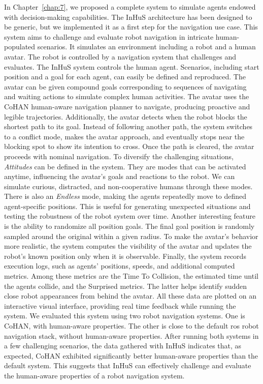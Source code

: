 In Chapter~\ref{chap:7}, we proposed a complete system to simulate agents endowed with decision-making capabilities. The InHuS architecture has been designed to be generic, but we implemented it as a first step for the navigation use case. 
This system aims to challenge and evaluate robot navigation in intricate human-populated scenarios. It simulates an environment including a robot and a human avatar. The robot is controlled by a navigation system that challenges and evaluates. The InHuS system controls the human agent. Scenarios, including start position and a goal for each agent, can easily be defined and reproduced. The avatar can be given compound goals corresponding to sequences of navigating and waiting actions to simulate complex human activities. 
The avatar uses the CoHAN human-aware navigation planner to navigate, producing proactive and legible trajectories. 
Additionally, the avatar detects when the robot blocks the shortest path to its goal. Instead of following another path, the system switches to a conflict mode, makes the avatar approach, and eventually stops near the blocking spot to show its intention to cross. Once the path is cleared, the avatar proceeds with nominal navigation.
To diversify the challenging situations, \textit{Attitudes} can be defined in the system. They are modes that can be activated anytime, influencing the avatar's goals and reactions to the robot. We can simulate curious, distracted, and non-cooperative humans through these modes. There is also an \textit{Endless} mode, making the agents repeatedly move to defined agent-specific positions. This is useful for generating unexpected situations and testing the robustness of the robot system over time. Another interesting feature is the ability to randomize all position goals. The final goal position is randomly sampled around the original within a given radius. 
To make the avatar's behavior more realistic, the system computes the visibility of the avatar and updates the robot's known position only when it is observable. 
Finally, the system records execution logs, such as agents' positions, speeds, and additional computed metrics. Among these metrics are the Time To Collision, the estimated time until the agents collide, and the Surprised metrics. The latter helps identify sudden close robot appearances from behind the avatar. All these data are plotted on an interactive visual interface, providing real time feedback while running the system.
We evaluated this system using two robot navigation systems. One is CoHAN, with human-aware properties. The other is close to the default \acrshort{ros} robot navigation stack, without human-aware properties.
After running both systems in a few challenging scenarios, the data gathered with InHuS indicates that, as expected, CoHAN exhibited significantly better human-aware properties than the default system. This suggests that InHuS can effectively challenge and evaluate the human-aware properties of a robot navigation system. 

